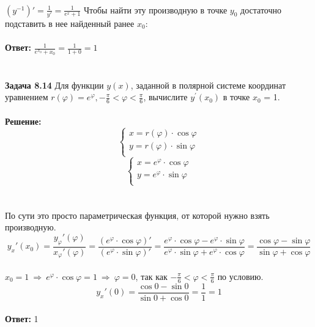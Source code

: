 \documentclass[12pt]{article}
\renewcommand{\phi}{\varphi}
\begin{document}
    \\
    \par $(y^{-1})' = \frac{1}{y'} = \frac{1}{e^{x} + 1}$ Чтобы найти эту производную в точке $y_0$ достаточно подставить в нее найденный ранее $x_0$:
    \\
    \\ \textbf{Ответ: } $\frac{1}{e^{x_0} + x_0} = \frac{1}{1 + 0} = 1$
    \\ \\ \\
    {\large \bf Задача 8.14} Для функции $y(x)$, заданной в полярной системе координат уравнением $r(\phi) = e^{\phi}, -\frac{\pi}{6} < \phi < \frac{\pi}{6}$, вычислите $y^{'}(x_0)$ в точке $x_0$ = 1.
    \\
    \\ \textbf{Решение: }
    \begin{equation*}
      \begin{cases}
          x = r(\varphi) \cdot \cos{\varphi} \\
          y = r(\varphi) \cdot \sin{\varphi} \\
      \end{cases}
    \end{equation*}
    \begin{equation*}
      \begin{cases}
          x = e^{\varphi} \cdot \cos{\varphi} \\
          y = e^{\varphi} \cdot \sin{\varphi} \\
      \end{cases}
    \end{equation*}
    \\
    \\ По сути это просто параметрическая функция, от которой нужно взять производную.
    \[
      y_x'(x_0) = \frac{y_{\varphi}'(\varphi)}{x_{\varphi}'(\varphi)} = \frac{(e^{\varphi} \cdot \cos{\varphi})'}{(e^{\varphi} \cdot \sin{\varphi})'} = \frac{e^{\varphi} \cdot \cos{\varphi} - e^{\varphi} \cdot \sin{\varphi}}{e^{\varphi} \cdot \sin{\varphi} + e^{\varphi} \cdot \cos{\varphi}} = \frac{\cos{\varphi} - \sin{\varphi}}{\sin{\varphi} + \cos{\varphi}}
    \]
    \\ $x_0 = 1 \ \Rightarrow \ e^{\varphi} \cdot \cos{\varphi} = 1 \ \Rightarrow \ \varphi = 0$, так как $-\frac{\pi}{6} < \phi < \frac{\pi}{6}$ по условию.
    \\
    \[
      y_x'(0) = \frac{\cos{0} - \sin{0}}{\sin{0} + \cos{0}} = \frac{1}{1} = 1
    \]
    \\ \textbf{Ответ: } 1
\end{document}
